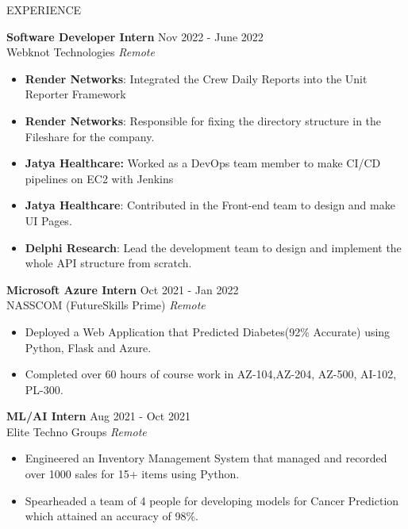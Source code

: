 \documentclass{resume} %
\begin{document}
\begin{rSection}{EXPERIENCE}

\textbf{Software Developer Intern} \hfill Nov 2022 - June 2022\\
Webknot Technologies \hfill \textit{Remote}
 \begin{itemize}
    \itemsep -2pt {} 
     \item \textbf{Render Networks}: Integrated the Crew Daily Reports into the Unit Reporter Framework
    \item \textbf{Render Networks}: Responsible for fixing the directory structure in the Fileshare for the company.
    \item \textbf{Jatya Healthcare:} Worked as a DevOps team member to make CI/CD pipelines on EC2 with Jenkins
    \item \textbf{Jatya Healthcare}: Contributed in the Front-end team to design and make UI Pages.
    \item \textbf{Delphi Research}: Lead the development team to design and implement the whole API structure from scratch.
 \end{itemize}


 
\textbf{Microsoft Azure Intern} \hfill Oct 2021 - Jan 2022\\
NASSCOM (FutureSkills Prime) \hfill \textit{Remote}
 \begin{itemize}
    \itemsep -2pt {} 
     \item Deployed a Web Application that Predicted Diabetes(92\% Accurate) using Python, Flask and Azure.
     \item Completed over 60 hours of course work in AZ-104,AZ-204, AZ-500, AI-102, PL-300.
 \end{itemize}

\textbf{ML/AI Intern} \hfill Aug 2021 - Oct 2021\\
Elite Techno Groups \hfill \textit{Remote}
 \begin{itemize}
    \itemsep -2pt {} 
     \item Engineered an Inventory Management System that managed and recorded over 1000 sales for 15+ items using Python.
     \item Spearheaded a team of 4 people for developing models for Cancer Prediction which attained an accuracy of 98\%.
 \end{itemize}

\end{rSection} 

\end{document}
